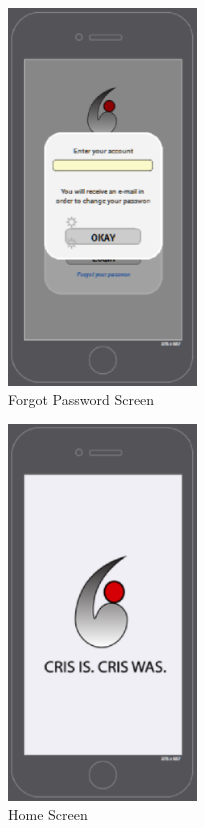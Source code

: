 \begin{figure}[htbp]
\begin{center}
 \caption{\label{fig:A1} Forgot Password Screen}
   \includegraphics[width=50mm]{./images/App/forgotpasswort.eps}
\end{center}
\end{figure}
\begin{figure}[htbp]
\begin{center}
 \caption{\label{fig:A2P} Home Screen}
   \includegraphics[width=50mm]{./images/App/home.eps}
\end{center}
\end{figure}
